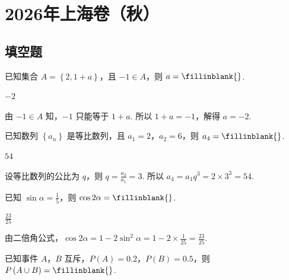 \chapter{2026年上海卷（秋）}

\section{填空题}

\begin{problem}
已知集合 \( A=\left\{ 2,1+a \right\} \)，且 \( -1\in A \)，则 \( a=\fillinblank{} \).
\end{problem}

\begin{answer}
\(-2\)
\end{answer}

\begin{solution}
由 \( -1\in A \) 知，\( -1 \) 只能等于 \( 1+a \). 所以 \( 1+a=-1 \)，解得 \( a=-2 \).
\end{solution}

\begin{problem}
已知数列 \( \left\{ a_n \right\} \) 是等比数列，且 \( a_1=2 \)，\( a_2=6 \)，则 \( a_4=\fillinblank{} \).
\end{problem}

\begin{answer}
\(54\)
\end{answer}

\begin{solution}
设等比数列的公比为 \( q \)，则 \( q=\frac{a_2}{a_1}=3 \). 所以 \( a_4=a_1 q^3=2\times 3^3=54 \).
\end{solution}

\begin{problem}
已知 \( \sin \alpha=\frac{1}{5} \)，则 \( \cos 2\alpha=\fillinblank{} \).
\end{problem}

\begin{answer}
\(\frac{23}{25}\)
\end{answer}

\begin{solution}
由二倍角公式，\( \cos 2\alpha=1-2\sin^2\alpha=1-2\times \frac{1}{25}=\frac{23}{25} \).
\end{solution}

\begin{problem}
已知事件 \(A\)，\(B\) 互斥，\( P\left( A \right)=0.2 \)，\( P\left( B \right)=0.5 \)，则 \( P\left( A\cup B \right)=\fillinblank{} \).
\end{problem}

